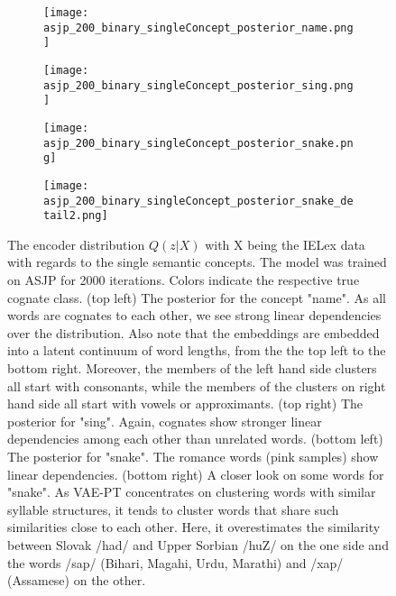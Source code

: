 \documentclass[6pt]{article}
\begin{document}
 \begin{figure}[h!] 
  \begin{subfigure}[b]{0.5\linewidth}
    \centering
    \texttt{[image: asjp\_200\_binary\_singleConcept\_posterior\_name.png]} 
    \label{fig:vae_phono_orthofeatures0} 
    \vspace{4ex}
  \end{subfigure}%
  \begin{subfigure}[b]{0.5\linewidth}
    \centering
    \texttt{[image: asjp\_200\_binary\_singleConcept\_posterior\_sing.png]} 
    \label{fig:vae_phono_orthofeatures1} 
    \vspace{4ex}
  \end{subfigure} 
  \begin{subfigure}[b]{0.5\linewidth}
    \centering
    \texttt{[image: asjp\_200\_binary\_singleConcept\_posterior\_snake.png]} 
    \label{fig:vae_phono_orthofeatures2} 
  \end{subfigure}%
  \begin{subfigure}[b]{0.5\linewidth}
    \centering
    \texttt{[image: asjp\_200\_binary\_singleConcept\_posterior\_snake\_detail2.png]} 
    \label{fig:vae_phono_orthofeatures3} 
  \end{subfigure} 
  \caption{The encoder distribution $Q(z|X)$ with X being the IELex data with regards to the single semantic concepts. The model was trained on ASJP for 2000 iterations. Colors indicate the respective true cognate class. (top left) The posterior for the concept "name". As all words are cognates to each other, we see strong linear dependencies over the distribution. Also note that the embeddings are embedded into a latent continuum of word lengths, from the the top left to the bottom right. Moreover, the members of the left hand side clusters all start with consonants, while the members of the clusters on right hand side all start with vowels or approximants. (top right) The posterior for "sing". Again, cognates show stronger linear dependencies among each other than unrelated words. (bottom left) The posterior for "snake". The romance words (pink samples) show linear dependencies. (bottom right) A closer look on some words for "snake". As VAE-PT concentrates on clustering words with similar syllable structures, it tends to cluster words that share such similarities close to each other. Here, it overestimates the similarity between Slovak /had/ and Upper Sorbian /huZ/ on the one side and the words /sap/ (Bihari, Magahi, Urdu, Marathi) and /xap/ (Assamese) on the other.  }
  \label{fig:asjp_2000_binary_singleIELEXConcepts_posteriors} 
\end{figure}
\end{document}
